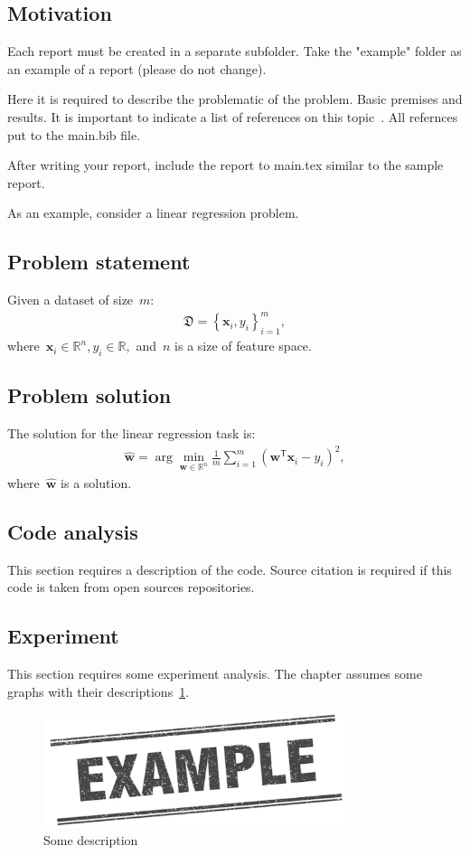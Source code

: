 \documentclass[../../main.tex]{subfiles}
\begin{document}
\subsection{Motivation}

Each report must be created in a separate subfolder. Take the "example" folder as an example of a report (please do not change).

Here it is required to describe the problematic of the problem. Basic premises and results. It is important to indicate a list of references on this topic~\cite{AuthorYear}. All refernces put to the main.bib file.

After writing your report, include the report to main.tex similar to the sample report.


As an example, consider a linear regression problem.

\subsection{Problem statement}

Given a dataset of size~$m$:
\[
\label{eq:example:1}
\begin{aligned}
    \mathfrak{D} = \left\{\mathbf{x}_i, y_i\right\}_{i=1}^{m},
\end{aligned}
\]
where~$\mathbf{x}_i \in \mathbb{R}^{n}, y_i \in \mathbb{R},$ and~$n$ is a size of feature space.

\subsection{Problem solution}

The solution for the linear regression task is:
\[
\label{eq:example:2}
\begin{aligned}
   \hat{\mathbf{w}} = \arg\min_{\mathbf{w}\in \mathbb{R}^{n}} \frac{1}{m}\sum_{i=1}^{m}\left(\textbf{w}^{\mathsf{T}}\textbf{x}_i - y_i\right)^2,
\end{aligned}
\]
where~$\hat{\mathbf{w}}$ is a solution.

\subsection{Code analysis}

This section requires a description of the code. Source citation is required if this code is taken from open sources repositories.

\subsection{Experiment}

This section requires some experiment analysis. The chapter assumes some graphs with their descriptions~\ref{fig:example:1}.

\begin{figure}[h!]
\centering
\includegraphics[width=0.8\textwidth]{figures/fig1}
\caption{Some description}
\label{fig:example:1}
\end{figure}
\end{document}
